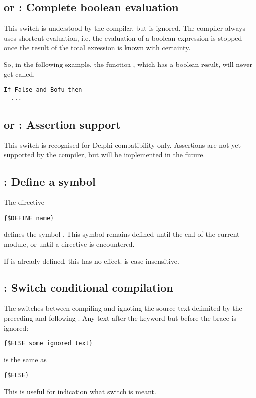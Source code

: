 \documentclass{report}
\begin{document}
\subsection{ or : Complete boolean evaluation}

This switch is understood by the \fpc compiler, but is ignored. The compiler
always uses shortcut evaluation, i.e. the evaluation of a boolean expression
is stopped once the result of the total exression is known with certainty.

So, in the following example, the function , which has a boolean
result, will never get called.
\begin{verbatim}
If False and Bofu then
  ...
\end{verbatim}

\subsection{ or  : Assertion support}

This switch is recognised for Delphi compatibility only. Assertions are not
yet supported by the compiler, but will be implemented in the future.

\subsection{ : Define a symbol}

The directive
\begin{verbatim}
{$DEFINE name}
\end{verbatim}
defines the symbol . This symbol remains defined until the end of
the current module, or until a  directive is encountered.

If  is already defined, this has no effect.  is case
insensitive.


\subsection{ : Switch conditional compilation}

The  switches between compiling and ignoting the source
text delimited by the preceding  and following
. Any text after the  keyword but before the
brace is ignored:
\begin{verbatim}
{$ELSE some ignored text}
\end{verbatim}
is the same as
\begin{verbatim}
{$ELSE}
\end{verbatim}
This is useful for indication what switch is meant.
\end{document}
